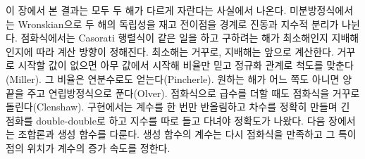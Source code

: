 이 장에서 본 결과는 모두 두 해가 다르게 자란다는 사실에서 나온다. 미분방정식에서는 Wronskian으로 두 해의 독립성을 재고 전이점을 경계로 진동과 지수적 분리가 나뉜다. 점화식에서는 Casorati 행렬식이 같은 일을 하고 구하려는 해가 최소해인지 지배해인지에 따라 계산 방향이 정해진다. 최소해는 거꾸로, 지배해는 앞으로 계산한다. 거꾸로 시작할 값이 없으면 아무 값에서 시작해 비율만 믿고 정규화 관계로 척도를 맞춘다(Miller). 그 비율은 연분수로도 얻는다(Pincherle). 원하는 해가 어느 쪽도 아니면 양 끝을 주고 연립방정식으로 푼다(Olver). 점화식으로 급수를 더할 때도 점화식을 거꾸로 돌린다(Clenshaw). 구현에서는 계수를 한 번만 반올림하고 차수를 정확히 만들며 긴 점화를 double-double로 하고 지수를 따로 들고 다녀야 정확도가 나왔다. 다음 장에서는 조합론과 생성 함수를 다룬다. 생성 함수의 계수는 다시 점화식을 만족하고 그 특이점의 위치가 계수의 증가 속도를 정한다.

\chapterreferences
